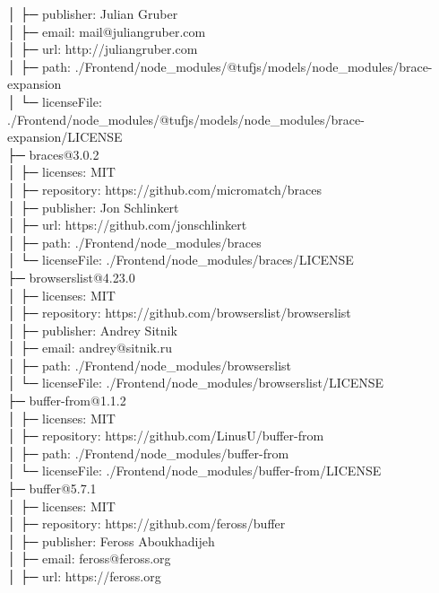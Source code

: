 \documentclass[
    paper=a4,
    twoside=false,
    parskip=half,
    listof=entryprefix,
    listof=totoc,
    index=totoc,
    bibliography=totoc,
    headsepline,
]{scrbook}
\begin{document}
    │  ├─ publisher: Julian Gruber\\
    │  ├─ email: mail@juliangruber.com\\
    │  ├─ url: http://juliangruber.com\\
    │  ├─ path: ./Frontend/node\_modules/@tufjs/models/node\_modules/brace-expansion\\
    │  └─ licenseFile: ./Frontend/node\_modules/@tufjs/models/node\_modules/brace-expansion/LICENSE\\
    ├─ braces@3.0.2\\
    │  ├─ licenses: MIT\\
    │  ├─ repository: https://github.com/micromatch/braces\\
    │  ├─ publisher: Jon Schlinkert\\
    │  ├─ url: https://github.com/jonschlinkert\\
    │  ├─ path: ./Frontend/node\_modules/braces\\
    │  └─ licenseFile: ./Frontend/node\_modules/braces/LICENSE\\
    ├─ browserslist@4.23.0\\
    │  ├─ licenses: MIT\\
    │  ├─ repository: https://github.com/browserslist/browserslist\\
    │  ├─ publisher: Andrey Sitnik\\
    │  ├─ email: andrey@sitnik.ru\\
    │  ├─ path: ./Frontend/node\_modules/browserslist\\
    │  └─ licenseFile: ./Frontend/node\_modules/browserslist/LICENSE\\
    ├─ buffer-from@1.1.2\\
    │  ├─ licenses: MIT\\
    │  ├─ repository: https://github.com/LinusU/buffer-from\\
    │  ├─ path: ./Frontend/node\_modules/buffer-from\\
    │  └─ licenseFile: ./Frontend/node\_modules/buffer-from/LICENSE\\
    ├─ buffer@5.7.1\\
    │  ├─ licenses: MIT\\
    │  ├─ repository: https://github.com/feross/buffer\\
    │  ├─ publisher: Feross Aboukhadijeh\\
    │  ├─ email: feross@feross.org\\
    │  ├─ url: https://feross.org\\
\end{document}

